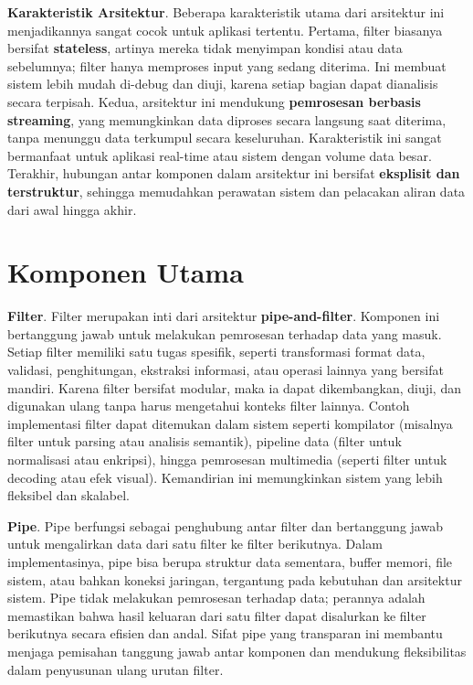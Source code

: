 \textbf{Karakteristik Arsitektur}.  
Beberapa karakteristik utama dari arsitektur ini menjadikannya sangat cocok untuk aplikasi tertentu. Pertama, filter biasanya bersifat \textbf{stateless}, artinya mereka tidak menyimpan kondisi atau data sebelumnya; filter hanya memproses input yang sedang diterima. Ini membuat sistem lebih mudah di-debug dan diuji, karena setiap bagian dapat dianalisis secara terpisah. Kedua, arsitektur ini mendukung \textbf{pemrosesan berbasis streaming}, yang memungkinkan data diproses secara langsung saat diterima, tanpa menunggu data terkumpul secara keseluruhan. Karakteristik ini sangat bermanfaat untuk aplikasi real-time atau sistem dengan volume data besar. Terakhir, hubungan antar komponen dalam arsitektur ini bersifat \textbf{eksplisit dan terstruktur}, sehingga memudahkan perawatan sistem dan pelacakan aliran data dari awal hingga akhir.

\section{Komponen Utama}

\textbf{Filter}.  
Filter merupakan inti dari arsitektur \textbf{pipe-and-filter}. Komponen ini bertanggung jawab untuk melakukan pemrosesan terhadap data yang masuk. Setiap filter memiliki satu tugas spesifik, seperti transformasi format data, validasi, penghitungan, ekstraksi informasi, atau operasi lainnya yang bersifat mandiri. Karena filter bersifat modular, maka ia dapat dikembangkan, diuji, dan digunakan ulang tanpa harus mengetahui konteks filter lainnya. Contoh implementasi filter dapat ditemukan dalam sistem seperti kompilator (misalnya filter untuk parsing atau analisis semantik), pipeline data (filter untuk normalisasi atau enkripsi), hingga pemrosesan multimedia (seperti filter untuk decoding atau efek visual). Kemandirian ini memungkinkan sistem yang lebih fleksibel dan skalabel.

\textbf{Pipe}.  
Pipe berfungsi sebagai penghubung antar filter dan bertanggung jawab untuk mengalirkan data dari satu filter ke filter berikutnya. Dalam implementasinya, pipe bisa berupa struktur data sementara, buffer memori, file sistem, atau bahkan koneksi jaringan, tergantung pada kebutuhan dan arsitektur sistem. Pipe tidak melakukan pemrosesan terhadap data; perannya adalah memastikan bahwa hasil keluaran dari satu filter dapat disalurkan ke filter berikutnya secara efisien dan andal. Sifat pipe yang transparan ini membantu menjaga pemisahan tanggung jawab antar komponen dan mendukung fleksibilitas dalam penyusunan ulang urutan filter.

